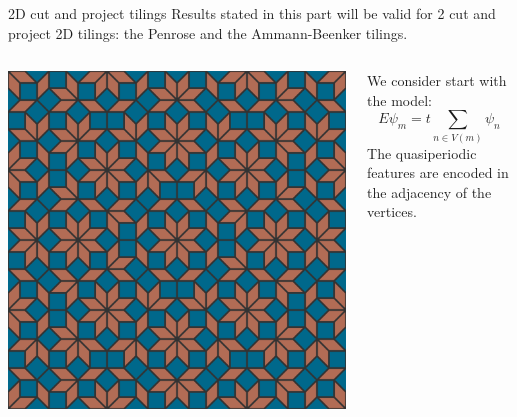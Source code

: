 \documentclass[xcolor=x11names,compress,professionalfonts]{beamer}
\renewcommand{\(}{\begin{columns}}
\renewcommand{\)}{\end{columns}}
\newcommand{\<}[1]{\begin{column}{#1}}
\renewcommand{\>}{\end{column}}
\begin{document}
\begin{frame}{2D cut and project tilings}
Results stated in this part will be valid for 2 cut and project 2D tilings: the Penrose and the Ammann-Beenker tilings.
\begin{columns}
\begin{column}{5cm}
{\centering
\includegraphics[scale=.1]{img/ammann-beenker.png}

}
\end{column}
\begin{column}{5cm}
We consider start with the model:
\[
	E \psi_m = t\sum_{n \in V(m)} \psi_n
\]
The quasiperiodic features are encoded in the adjacency of the vertices.
\end{column}
\end{columns}
\end{frame}
\end{document}
